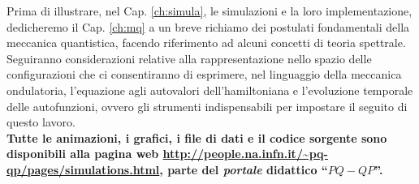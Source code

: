 Prima di illustrare, nel Cap. \ref{ch:simula}, le simulazioni e 
la loro implementazione, dedicheremo il Cap. \ref{ch:mq}
a un breve richiamo dei postulati fondamentali della meccanica
quantistica, facendo riferimento ad alcuni concetti di teoria spettrale. 
Seguiranno considerazioni relative
alla rappresentazione nello spazio delle configurazioni che ci 
consentiranno di esprimere, nel linguaggio della meccanica
ondulatoria, l'equazione agli autovalori dell'hamiltoniana e 
l'evoluzione temporale delle autofunzioni, ovvero gli strumenti 
indispensabili per impostare il seguito di questo lavoro.
\vspace{5pt} \\  %
\textbf{
	Tutte le animazioni, i grafici, i file di dati e il codice
	sorgente sono disponibili alla
	pagina web \url{http://people.na.infn.it/~pq-qp/pages/simulations.html},
	parte del \emph{portale} didattico ``$PQ-QP$''\cite{PQ-QP}.
}

